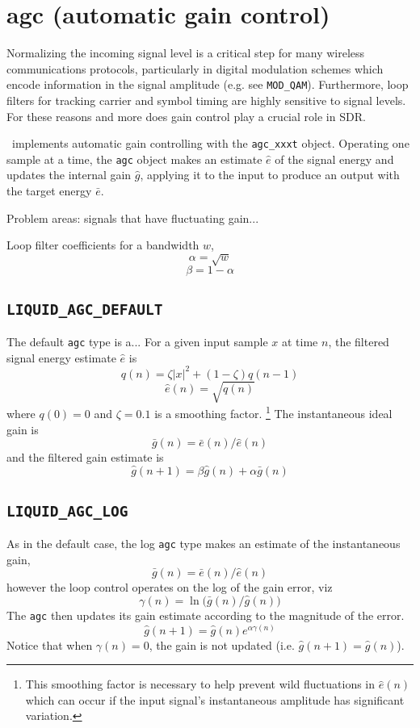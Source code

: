 % 
%

\section{agc (automatic gain control)}
\label{module:agc}
Normalizing the incoming signal level is a critical step for many wireless
communications protocols, particularly in digital modulation schemes which
encode information in the signal amplitude (e.g. see {\tt MOD\_QAM}).
Furthermore, loop filters for tracking carrier and symbol timing are highly
sensitive to signal levels.
For these reasons and more does gain control play a crucial role in SDR.

\liquid\ implements automatic gain controlling with the {\tt agc\_xxxt}
object.
Operating one sample at a time, the {\tt agc} object makes an estimate
$\hat{e}$ of the signal energy and updates the internal gain $\hat{g}$,
applying it to the input to produce an output with the target energy
$\bar{e}$.

Problem areas: signals that have fluctuating gain...

Loop filter coefficients for a bandwidth $w$,
\[  \alpha = \sqrt{w}  \]
\[  \beta = 1 - \alpha   \]

\subsection{{\tt LIQUID\_AGC\_DEFAULT}}
The default {\tt agc} type is a... For a given input sample $x$ at time $n$,
the filtered signal energy estimate $\hat{e}$ is
\[  q(n) = \zeta|x|^2 + (1-\zeta)q(n-1)     \]
\[  \hat{e}(n) = \sqrt{q(n)}                \]
where $q(0)=0$ and $\zeta=0.1$ is a smoothing factor.%
\footnote{This smoothing factor is necessary to help prevent wild fluctuations
in $\hat{e}(n)$ which can occur if the input signal's instantaneous amplitude
has significant variation.}
The instantaneous ideal gain is
\[
    \bar{g}(n) = \bar{e}(n) / \hat{e}(n)
\]
and the filtered gain estimate is
\[
    \hat{g}(n+1) = \beta \hat{g}(n) + \alpha \bar{g}(n)
\]

\subsection{{\tt LIQUID\_AGC\_LOG}}
As in the default case, the log {\tt agc} type makes an estimate of the
instantaneous gain,
\[
    \bar{g}(n) = \bar{e}(n) / \hat{e}(n)
\]
however the loop control operates on the log of the gain error, viz
\[
    \gamma(n) = \ln\bigl( \bar{g}(n) / \hat{g}(n) \bigr)
\]
The {\tt agc} then updates its gain estimate according to the magnitude of the
error.
\[
    \hat{g}(n+1) = \hat{g}(n) e^{ \alpha \gamma(n) }
\]
Notice that when $\gamma(n)=0$, the gain is not updated
(i.e. $\hat{g}(n+1) = \hat{g}(n)$).


